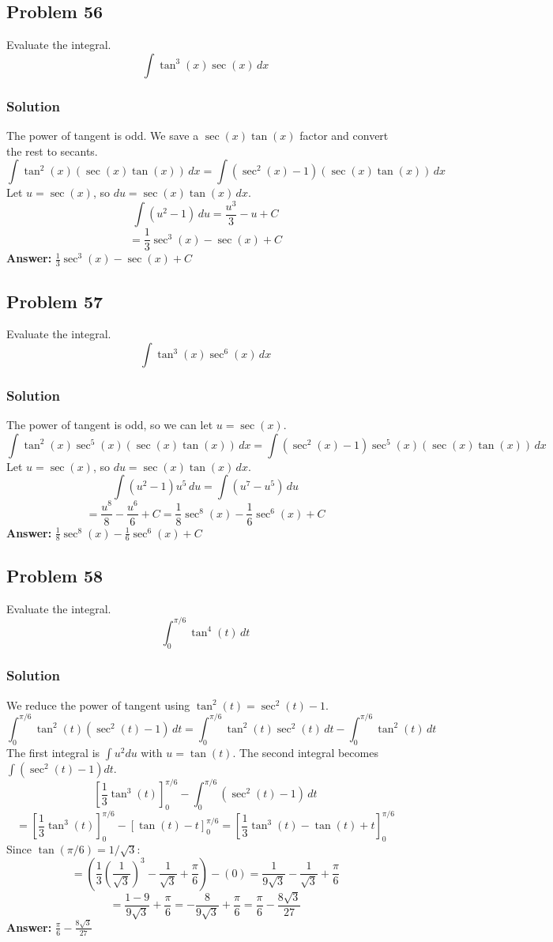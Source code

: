 \documentclass{article}
\begin{document}
\subsection{Problem 56}
Evaluate the integral.
$$ \int \tan^3(x) \sec(x) \,dx $$
\subsubsection*{Solution}
The power of tangent is odd. We save a $\sec(x)\tan(x)$ factor and convert the rest to secants.
$$ \int \tan^2(x) (\sec(x)\tan(x)) \,dx = \int (\sec^2(x) - 1) (\sec(x)\tan(x)) \,dx $$
Let $u = \sec(x)$, so $du = \sec(x)\tan(x) \,dx$.
$$ \int (u^2 - 1) \,du = \frac{u^3}{3} - u + C $$
$$ = \frac{1}{3}\sec^3(x) - \sec(x) + C $$
\textbf{Answer:} $ \frac{1}{3}\sec^3(x) - \sec(x) + C $
\subsection{Problem 57}
Evaluate the integral.
$$ \int \tan^3(x) \sec^6(x) \,dx $$
\subsubsection*{Solution}
The power of tangent is odd, so we can let $u=\sec(x)$.
$$ \int \tan^2(x) \sec^5(x) (\sec(x)\tan(x)) \,dx = \int (\sec^2(x) - 1) \sec^5(x) (\sec(x)\tan(x)) \,dx $$
Let $u = \sec(x)$, so $du = \sec(x)\tan(x) \,dx$.
$$ \int (u^2 - 1) u^5 \,du = \int (u^7 - u^5) \,du $$
$$ = \frac{u^8}{8} - \frac{u^6}{6} + C = \frac{1}{8}\sec^8(x) - \frac{1}{6}\sec^6(x) + C $$
\textbf{Answer:} $ \frac{1}{8}\sec^8(x) - \frac{1}{6}\sec^6(x) + C $
\subsection{Problem 58}
Evaluate the integral.
$$ \int_{0}^{\pi/6} \tan^4(t) \,dt $$
\subsubsection*{Solution}
We reduce the power of tangent using $\tan^2(t) = \sec^2(t) - 1$.
$$ \int_{0}^{\pi/6} \tan^2(t) (\sec^2(t) - 1) \,dt = \int_{0}^{\pi/6} \tan^2(t)\sec^2(t) \,dt - \int_{0}^{\pi/6} \tan^2(t) \,dt $$
The first integral is $\int u^2 du$ with $u=\tan(t)$. The second integral becomes $\int (\sec^2(t)-1)dt$.
$$ \left[ \frac{1}{3}\tan^3(t) \right]_{0}^{\pi/6} - \int_{0}^{\pi/6} (\sec^2(t) - 1) \,dt $$
$$ = \left[ \frac{1}{3}\tan^3(t) \right]_{0}^{\pi/6} - \left[ \tan(t) - t \right]_{0}^{\pi/6} = \left[ \frac{1}{3}\tan^3(t) - \tan(t) + t \right]_{0}^{\pi/6} $$
Since $\tan(\pi/6) = 1/\sqrt{3}$:
$$ = \left( \frac{1}{3}\left(\frac{1}{\sqrt{3}}\right)^3 - \frac{1}{\sqrt{3}} + \frac{\pi}{6} \right) - (0) = \frac{1}{9\sqrt{3}} - \frac{1}{\sqrt{3}} + \frac{\pi}{6} $$
$$ = \frac{1 - 9}{9\sqrt{3}} + \frac{\pi}{6} = -\frac{8}{9\sqrt{3}} + \frac{\pi}{6} = \frac{\pi}{6} - \frac{8\sqrt{3}}{27} $$
\textbf{Answer:} $ \frac{\pi}{6} - \frac{8\sqrt{3}}{27} $
\end{document}
